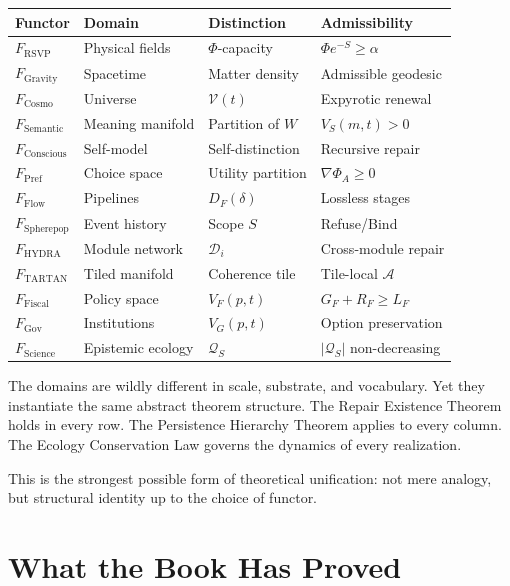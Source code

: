 \documentclass[12pt,twoside,openright]{book}
\newcommand{\adm}{\mathcal{A}}
\begin{document}
\begin{center}
\begin{tabular}{llll}
\toprule
Functor & Domain & Distinction & Admissibility \\
\midrule
$F_\mathrm{RSVP}$ & Physical fields &
  $\Phi$-capacity & $\Phi e^{-S} \ge \alpha$ \\
$F_\mathrm{Gravity}$ & Spacetime &
  Matter density & Admissible geodesic \\
$F_\mathrm{Cosmo}$ & Universe &
  $\mathcal{V}(t)$ & Expyrotic renewal \\
$F_\mathrm{Semantic}$ & Meaning manifold &
  Partition of $W$ & $V_S(m,t) > 0$ \\
$F_\mathrm{Conscious}$ & Self-model &
  Self-distinction & Recursive repair \\
$F_\mathrm{Pref}$ & Choice space &
  Utility partition & $\nabla\Phi_A \ge 0$ \\
$F_\mathrm{Flow}$ & Pipelines &
  $D_F(\delta)$ & Lossless stages \\
$F_\mathrm{Spherepop}$ & Event history &
  Scope $S$ & Refuse/Bind \\
$F_\mathrm{HYDRA}$ & Module network &
  $\mathcal{D}_i$ & Cross-module repair \\
$F_\mathrm{TARTAN}$ & Tiled manifold &
  Coherence tile & Tile-local $\adm$ \\
$F_\mathrm{Fiscal}$ & Policy space &
  $V_F(p,t)$ & $G_F+R_F \ge L_F$ \\
$F_\mathrm{Gov}$ & Institutions &
  $V_G(p,t)$ & Option preservation \\
$F_\mathrm{Science}$ & Epistemic ecology &
  $\mathcal{Q}_S$ & $|\mathcal{Q}_S|$ non-decreasing \\
\bottomrule
\end{tabular}
\end{center}

\noindent
The domains are wildly different in scale, substrate,
and vocabulary. Yet they instantiate the same abstract
theorem structure. The Repair Existence Theorem holds
in every row. The Persistence Hierarchy Theorem applies
to every column. The Ecology Conservation Law governs
the dynamics of every realization.

This is the strongest possible form of theoretical
unification: not mere analogy, but structural identity
up to the choice of functor.

\section{What the Book Has Proved}
\label{sec:ch30-proved}
\end{document}
